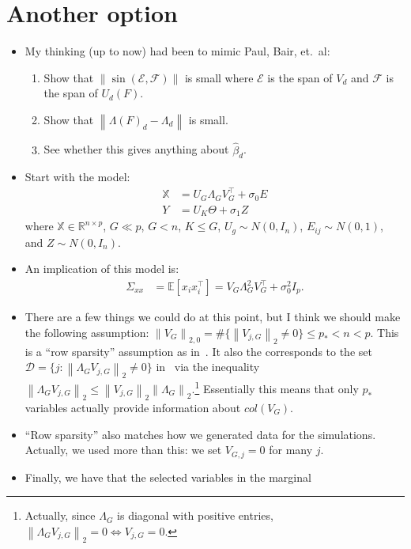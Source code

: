\documentclass[11pt]{article}
\newcommand{\norm}[1]{\left\lVert #1 \right\rVert}
\newcommand{\X}{\mathbb{X}}
\newcommand{\R}{\mathbb{R}}
\newcommand{\Expect}[1]{\mathbb{E}\left[ #1 \right]}
\begin{document}
\section{Another option}
\begin{itemize}
\item My thinking (up to now) had been to mimic Paul, Bair, et.\ al:
  \begin{enumerate}
  \item Show that $\norm{\sin(\mathcal{E},\mathcal{F})}$ is small
    where $\mathcal{E}$ is the span of $V_d$ and $\mathcal{F}$ is the
    span of $U_d(F)$.
  \item Show that $\norm{\Lambda(F)_d-\Lambda_d}$ is small.
  \item See whether this gives anything about $\hat{\beta}_d$.
  \end{enumerate}
\item Start with the model:
  \begin{align}
    \X &= U_G \Lambda_G V_G^\top + \sigma_0 E\\
    Y &= U_K\Theta + \sigma_1 Z
  \end{align}
  where $\X \in \R^{n\times p}$, $G \ll p$, $G <n$, $K\leq G$,
  $U_g\sim N(0,I_n)$, $E_{ij} \sim N(0,1)$, and $Z \sim N(0,I_n)$.
\item An implication of this model is:
  \begin{align}
  \Sigma_{xx} &= \Expect{x_i x_i^\top} = V_G\Lambda_G^2V^\top_G +
                \sigma_0^2 I_p.
  \end{align}
\item There are a few things we could do at this point, but I think we
  should make the following assumption:
  $\norm{V_G}_{2,0}=\#\{\norm{V_{j,G}}_2\neq 0\} \leq p_*
  <n<p$. This is a ``row sparsity'' assumption as
  in~\citet{VuLei2013}. It also the corresponds to the set
  $\mathcal{D} = \{j:\norm{\Lambda_G V_{j,G}}_2\neq 0\}$
  in~\citet{paul2008preconditioning} via the inequality
  $\norm{\Lambda_GV_{j,G}}_2 \leq
  \norm{V_{j,G}}_2\norm{\Lambda_G}_2$.\footnote{Actually, since $\Lambda_G$ is diagonal with
  positive entries, $\norm{\Lambda_G V_{j,G}}_2=0 \Leftrightarrow V_{j,G}=0$.}
  Essentially this means that
  only $p_*$ variables actually provide information about $col(V_G)$.
\item ``Row sparsity'' also matches how we generated data for the
  simulations. Actually, we used more than this: we set $V_{G,j}=0$ for many $j$.
\item Finally, we have that the selected variables in the marginal

\end{itemize}
\end{document}
